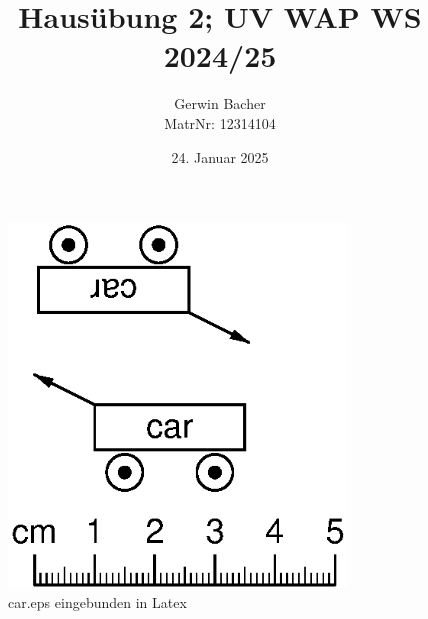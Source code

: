 \documentclass[ngerman]{article}
\begin{document}
\title{Hausübung 2; UV WAP WS 2024/25}
\author{Gerwin Bacher \\
MatrNr: 12314104}
\date{24. Januar 2025}

\maketitle

\begin{figure}[ht]
    \centering
    \includegraphics[width=0.8\textwidth]{car.eps}
    \caption{car.eps eingebunden in Latex}
    \label{fig:example_eps}
\end{figure}
\end{document}
